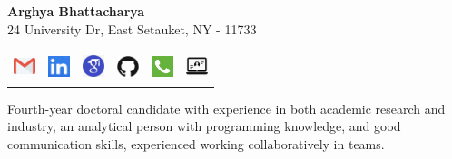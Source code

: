 \documentclass[letterpaper,10pt]{article}
\begin{document}
\begin{center}
\textbf{{\Huge Arghya Bhattacharya}} \\
\vspace{5pt}
{24 University Dr, East Setauket, NY - 11733} \\
\bigskip

\begin{tabular*}{\textwidth}{ m{3.5cm} m{3.5cm} m{3.5cm} m{3.5cm} m{3.5cm} m{3.5cm} }
\underline{\href{mailto:argbhattacha@cs.stonybrook.edu}{\includegraphics[width=0.25in,height=0.20in]{Figures/email.png}}} &

\underline{{\href{https://www.linkedin.com/in/arghya-bhattacharya-42522797/}{\includegraphics[width=0.25in,height=0.25in]{Figures/linkedin.png}}}} &

\underline{{\href{https://scholar.google.com/citations?user=tvw7c5wAAAAJ&hl=en}{\includegraphics[width=0.25in,height=0.25in]{Figures/googlescholar.png}}}} &

\underline{{\href{https://github.com/ArghyaB118}{\includegraphics[width=0.25in,height=0.25in]{Figures/github.png}}}} &

\underline{\href{tel:(+1)934-777-9896}{\includegraphics[width=0.25in,height=0.25in]{Figures/call.png}}} &

\underline{\href{https://www3.cs.stonybrook.edu/~argbhattacha/}{\includegraphics[width=0.25in,height=0.30in]{Figures/webpage.png}}} \\
\end{tabular*}
\end{center}

{Fourth-year doctoral candidate with experience in both academic research and industry, an analytical person with programming knowledge, and good communication skills, experienced working collaboratively in teams.}
\vspace{6pt}
\end{document}
